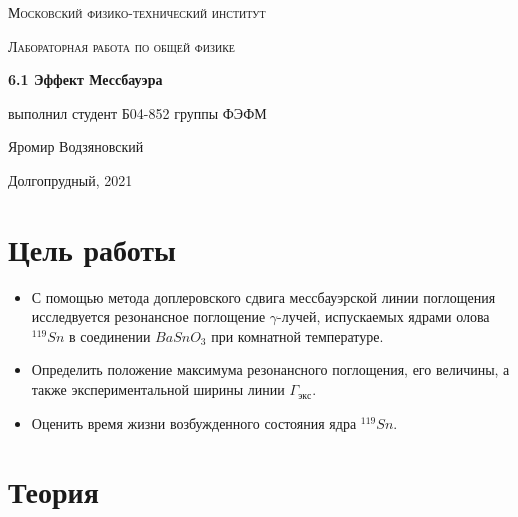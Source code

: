 \documentclass[a4paper]{article}
\begin{document}
\graphicspath{ {pictures/} }

\begin{titlepage}
	\centering
	\vspace{5cm}
    {\scshape\LARGE Московский физико-технический институт\par}
	\vspace{5cm}
	{\scshape\Large Лабораторная работа по общей физике \par}
	\vspace{1cm}
    {\huge\bfseries  6.1 Эффект Мессбауэра \par}
	\vspace{1cm}
	\vfill
    \begin{flushright}
        {\large выполнил студент Б04-852 группы ФЭФМ}\par
        \vspace{0.3cm}
        {\LARGE Яромир Водзяновский}
    \end{flushright}
	\vfill
Долгопрудный, 2021
\end{titlepage}

\pagestyle{fancy} 
\fancyhead[C]{}
\fancyfoot[C]{ \noindent\rule{\textwidth}{0.4pt} \thepage }

\tableofcontents

\newpage



\section{Цель работы}

\begin{itemize}
    \item С помощью метода доплеровского сдвига мессбауэрской линии поглощения исследвуется резонансное поглощение
    $\gamma$-лучей, испускаемых ядрами олова $^{119}Sn$ в соединении $Ba Sn O_3$ при комнатной температуре.
    \item Определить положение максимума резонансного поглощения, его величины, а также экспериментальной ширины линии 
    $\Gamma_{экс}$.
    \item Оценить время жизни возбужденного состояния ядра $^{119}Sn$.
    
\end{itemize}


\section{Теория}
\end{document}
